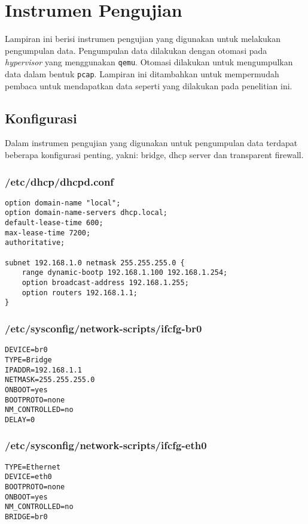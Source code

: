 \chapter{Instrumen Pengujian}

Lampiran ini berisi instrumen pengujian yang digunakan untuk melakukan pengumpulan data. Pengumpulan data dilakukan dengan otomasi pada \textit{hypervisor} yang menggunakan \verb|qemu|. Otomasi dilakukan untuk mengumpulkan data dalam bentuk \verb|pcap|. Lampiran ini ditambahkan untuk mempermudah pembaca untuk mendapatkan data seperti yang dilakukan pada penelitian ini.

\section{Konfigurasi}

Dalam instrumen pengujian yang digunakan untuk pengumpulan data terdapat beberapa konfigurasi penting, yakni: bridge, dhcp server dan transparent firewall.

\subsection{/etc/dhcp/dhcpd.conf}

\begin{lstlisting}
option domain-name "local";
option domain-name-servers dhcp.local;
default-lease-time 600;
max-lease-time 7200;
authoritative;

subnet 192.168.1.0 netmask 255.255.255.0 {
	range dynamic-bootp 192.168.1.100 192.168.1.254;
	option broadcast-address 192.168.1.255;
	option routers 192.168.1.1;
}
\end{lstlisting}

\subsection{/etc/sysconfig/network-scripts/ifcfg-br0}

\begin{lstlisting}
DEVICE=br0
TYPE=Bridge
IPADDR=192.168.1.1
NETMASK=255.255.255.0
ONBOOT=yes
BOOTPROTO=none
NM_CONTROLLED=no
DELAY=0
\end{lstlisting}

\subsection{/etc/sysconfig/network-scripts/ifcfg-eth0}

\begin{lstlisting}
TYPE=Ethernet
DEVICE=eth0
BOOTPROTO=none
ONBOOT=yes
NM_CONTROLLED=no
BRIDGE=br0
\end{lstlisting}

